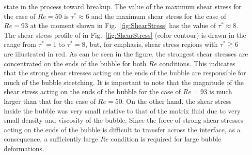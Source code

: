 \documentclass[%
 reprint,
 showkeys,
 amsmath,amssymb,
 aps,
 prfluids,
 onecolumn
]{revtex4-2}
\begin{document}
{state in the process toward breakup.  The value of the maximum shear stress for
the case of $Re = 50$ is $\tau ^{\ast} \approx 6$ and the maximum shear stress
for the case of $Re = 93$ at the moment shown in Fig.~\ref{fig:ShearStress} has
the value of $\tau ^{\ast} \approx 8$.  The shear stress profile of in
Fig.~\ref{fig:ShearStress} (color contour) is drawn in the range from $\tau
^{\ast} = 1$ to $\tau ^{\ast} = 8$, but, for emphasis, shear stress regions
with $\tau ^{\ast} \geqq 6$ are illustrated in red.  As can be seen in the
figure, the strongest shear stresses are concentrated on the ends of the bubble
for both $Re$ conditions.  This indicates that the strong shear stresses acting
on the ends of the bubble are responsible for much of the bubble stretching.
It is important to note that the magnitude of the shear stress acting on the
ends of the bubble for the case of $Re = 93$ is much larger than that for the
case of $Re = 50$.  On the other hand, the shear stress inside the bubble was
very small relative to that of the matrix fluid due to very small density and
viscosity of the bubble.  Since the force of strong shear stresses acting on
the ends of the bubble is difficult to transfer across the interface, as a
consequence, a sufficiently large $Re$ condition is required for large bubble
deformations.  }
\end{document}
